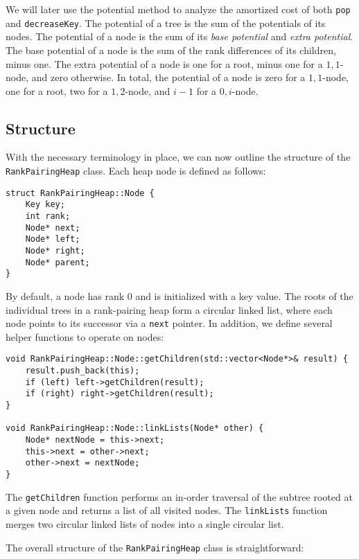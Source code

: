 We will later use the potential method to analyze the amortized cost of both \texttt{pop} and \texttt{decreaseKey}. The potential of a tree is the sum of the potentials of its nodes. The potential of a node is the sum of its \emph{base potential} and \emph{extra potential}. The base potential of a node is the sum of the rank differences of its children, minus one. The extra potential of a node is one for a root, minus one for a \(1,1\)-node, and zero otherwise. In total, the potential of a node is zero for a \(1,1\)-node, one for a root, two for a \(1,2\)-node, and \(i - 1\) for a \(0, i\)-node.

\subsection{Structure}

With the necessary terminology in place, we can now outline the structure of the \texttt{RankPairingHeap} class. Each heap node is defined as follows:

\begin{verbatim}
struct RankPairingHeap::Node {
    Key key;
    int rank;
    Node* next;
    Node* left;
    Node* right;
    Node* parent;
}
\end{verbatim}

By default, a node has rank \(0\) and is initialized with a key value. The roots of the individual trees in a rank-pairing heap form a circular linked list, where each node points to its successor via a \texttt{next} pointer. In addition, we define several helper functions to operate on nodes:

\begin{verbatim}
void RankPairingHeap::Node::getChildren(std::vector<Node*>& result) {
    result.push_back(this);
    if (left) left->getChildren(result);
    if (right) right->getChildren(result);
}

void RankPairingHeap::Node::linkLists(Node* other) {
    Node* nextNode = this->next;
    this->next = other->next;
    other->next = nextNode;
}
\end{verbatim}

The \texttt{getChildren} function performs an in-order traversal of the subtree rooted at a given node and returns a list of all visited nodes. The \texttt{linkLists} function merges two circular linked lists of nodes into a single circular list.

The overall structure of the \texttt{RankPairingHeap} class is straightforward:

